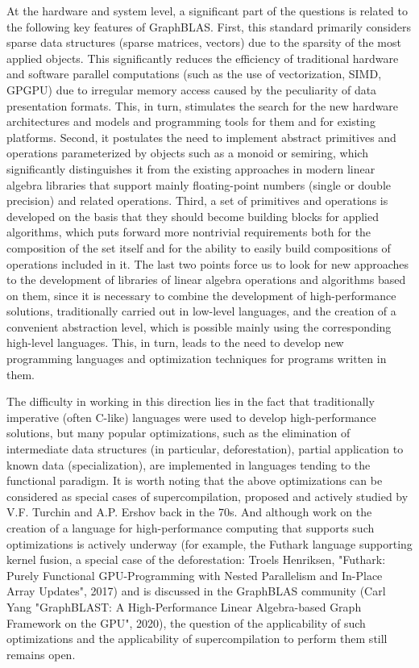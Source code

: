 \documentclass[12pt]{article}  %
\theoremstyle{remark}
\begin{document}
At the hardware and system level, a significant part of the questions is related to the following key features of GraphBLAS. First, this standard primarily considers sparse data structures (sparse matrices, vectors) due to the sparsity of the most applied objects. This significantly reduces the efficiency of traditional hardware and software parallel computations (such as the use of vectorization, SIMD, GPGPU) due to irregular memory access caused by the peculiarity of data presentation formats. This, in turn, stimulates the search for the new hardware architectures and models and programming tools for them and for existing platforms. Second, it postulates the need to implement abstract primitives and operations parameterized by objects such as a monoid or semiring, which significantly distinguishes it from the existing approaches in modern linear algebra libraries that support mainly floating-point numbers (single or double precision) and related operations. Third, a set of primitives and operations is developed on the basis that they should become building blocks for applied algorithms, which puts forward more nontrivial requirements both for the composition of the set itself and for the ability to easily build compositions of operations included in it. The last two points force us to look for new approaches to the development of libraries of linear algebra operations and algorithms based on them, since it is necessary to combine the development of high-performance solutions, traditionally carried out in low-level languages, and the creation of a convenient abstraction level, which is possible mainly using the corresponding high-level languages. This, in turn, leads to the need to develop new programming languages and optimization techniques for programs written in them.

The difficulty in working in this direction lies in the fact that traditionally imperative (often C-like) languages were used to develop high-performance solutions, but many popular optimizations, such as the elimination of intermediate data structures (in particular, deforestation), partial application to known data (specialization), are implemented in languages tending to the functional paradigm. It is worth noting that the above optimizations can be considered as special cases of supercompilation, proposed and actively studied by V.F. Turchin and A.P. Ershov back in the 70s. And although work on the creation of a language for high-performance computing that supports such optimizations is actively underway (for example, the Futhark language supporting kernel fusion, a special case of the deforestation: Troels Henriksen, "Futhark: Purely Functional GPU-Programming with Nested Parallelism and In-Place Array Updates", 2017) and is discussed in the GraphBLAS community (Carl Yang "GraphBLAST: A High-Performance Linear Algebra-based Graph Framework on the GPU", 2020), the question of the applicability of such optimizations and the applicability of supercompilation to perform them still remains open.
\end{document}
